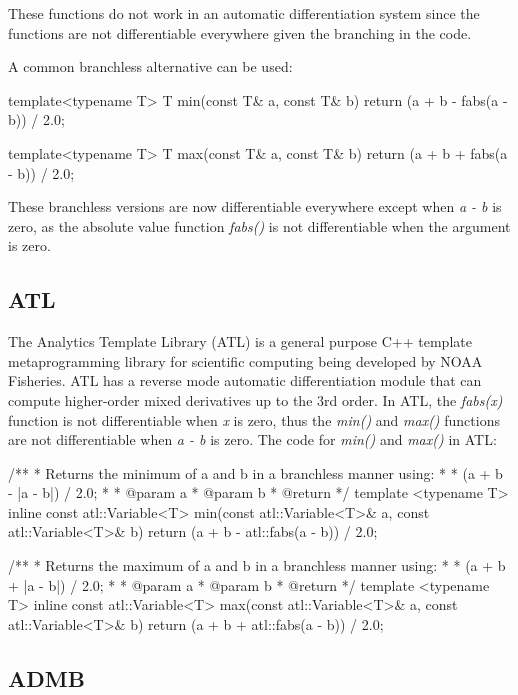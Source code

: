 \documentclass[oneside]{article}
\begin{document}
These functions do not work in an automatic differentiation system since the functions are not differentiable everywhere given the branching in the code.

A common branchless alternative can be used:

\begin{cppsource}
template<typename T>
T min(const T& a, const T& b){
   return (a + b - fabs(a - b)) / 2.0;
}

template<typename T>
T max(const T& a, const T& b){
   return (a + b + fabs(a - b)) / 2.0;
}
\end{cppsource}

These branchless versions are now differentiable everywhere except when \textit{a - b} is zero, as the absolute value function \textit{fabs()} is not differentiable when the argument is zero.

\subsection{ATL}

The Analytics Template Library (ATL) is a general purpose C++ template metaprogramming library for scientific computing being developed by NOAA Fisheries. ATL has a reverse mode automatic differentiation module that can compute higher-order mixed derivatives up to the 3rd order. In ATL, the \textit{fabs(x)} function is not differentiable when \textit{x} is zero, thus the \textit{min()} and \textit{max()} functions are not differentiable when \textit{a - b} is zero. The code for \textit{min()} and \textit{max()} in ATL:

\begin{cppsource}

/**
 * Returns the minimum of a and b in a branchless manner using:
 *
 * (a + b - |a - b|) / 2.0;
 *
 * @param a
 * @param b
 * @return
 */
template <typename T>
inline const atl::Variable<T> min(const atl::Variable<T>& a,
	const atl::Variable<T>& b) {
    return (a + b - atl::fabs(a - b)) / 2.0;
}

/**
 * Returns the maximum of a and b in a branchless manner using:
 *
 * (a + b + |a - b|) / 2.0;
 *
 * @param a
 * @param b
 * @return
 */
template <typename T>
inline const atl::Variable<T> max(const atl::Variable<T>& a,
	const atl::Variable<T>& b) {
    return (a + b + atl::fabs(a - b)) / 2.0;
}


\end{cppsource}


\subsection{ADMB}
\end{document}
